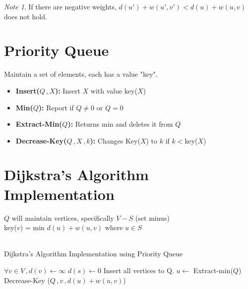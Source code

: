 \documentclass{article}
\theoremstyle{definition}
\theoremstyle{remark}
\newtheorem{note}{Note}[section]
\theoremstyle{plain}
\begin{document}
\begin{note}
If there are negative weights, $d(u') + w(u',v') < d(u) + w(u,v)$ does not hold.
\end{note}

\section{Priority Queue}
Maintain a set of elements, each has a value "key".\\

\begin{itemize}
	\item \textbf{Insert($Q\,,X$):} Insert $X$ with value key($X$)
	\item \textbf{Min($Q$):} Report if $Q \neq 0$ or $Q = 0$
	\item \textbf{Extract-Min($Q$):} Returns min and deletes it from $Q$
	\item \textbf{Decrease-Key($Q\,,X\,,k$):} Changes Key($X$) to $k$ if $k < $key($X$)
\end{itemize}

\section{Dijkstra's Algorithm Implementation}
$Q$ will maintain vertices, specifically $V - S$ (set minus)\\
key($v$) = min $d(u) + w(u,v)$ where $u \in S$\\\\

\begin{algorithm}
\caption{Dijkstra's Algorithm Implementation using Priority Queue}\label{Dijkstra's Algorithm to find the shortest paths}
\begin{algorithmic}[1]
	\State $\forall v \in V\,, d(v) \gets \infty$
	\State $d(s) \gets 0$
	\State Insert all vertices to Q.
		\State $u \gets $ Extract-min($Q$)
			\State Decrease-Key ($Q\,,v\,,d(u)+w(u,v)$) 
		\EndFor {}
	\EndWhile
	\EndProcedure
\end{algorithmic}
\end{algorithm}
\end{document}
